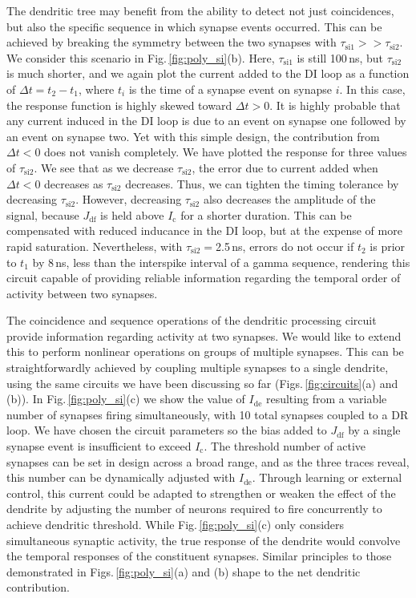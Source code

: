 \documentclass[twocolumn]{article}
\begin{document}
The dendritic tree may benefit from the ability to detect not just coincidences, but also the specific sequence in which synapse events occurred. This can be achieved by breaking the symmetry between the two synapses with $\tau_{\mathrm{si1}} >> \tau_{\mathrm{si2}}$. We consider this scenario in Fig.\,\ref{fig:poly_si}(b). Here, $\tau_{\mathrm{si1}}$ is still 100\,ns, but $\tau_{\mathrm{si2}}$ is much shorter, and we again plot the current added to the DI loop as a function of $\Delta t = t_2-t_1$, where $t_i$ is the time of a synapse event on synapse $i$. In this case, the response function is highly skewed toward $\Delta t > 0$. It is highly probable that any current induced in the DI loop is due to an event on synapse one followed by an event on synapse two. Yet with this simple design, the contribution from $\Delta t < 0$ does not vanish completely. We have plotted the response for three values of $\tau_{\mathrm{si2}}$. We see that as we decrease $\tau_{\mathrm{si2}}$, the error due to current added when $\Delta t < 0$ decreases as $\tau_{\mathrm{si2}}$ decreases. Thus, we can tighten the timing tolerance by decreasing $\tau_{\mathrm{si2}}$. However, decreasing $\tau_{\mathrm{si2}}$ also decreases the amplitude of the signal, because $J_{\mathrm{df}}$ is held above $I_{\mathrm{c}}$ for a shorter duration. This can be compensated with reduced inducance in the DI loop, but at the expense of more rapid saturation. Nevertheless, with $\tau_{\mathrm{si2}} = $2.5\,ns, errors do not occur if $t_2$ is prior to $t_1$ by 8\,ns, less than the interspike interval of a gamma sequence, rendering this circuit capable of providing reliable information regarding the temporal order of activity between two synapses.

The coincidence and sequence operations of the dendritic processing circuit provide information regarding activity at two synapses. We would like to extend this to perform nonlinear operations on groups of multiple synapses. This can be straightforwardly achieved by coupling multiple synapses to a single dendrite, using the same circuits we have been discussing so far (Figs.\,\ref{fig:circuits}(a) and (b)). In Fig.\,\ref{fig:poly_si}(c) we show the value of $I_{\mathrm{de}}$ resulting from a variable number of synapses firing simultaneously, with 10 total synapses coupled to a DR loop. We have chosen the circuit parameters so the bias added to $J_{\mathrm{df}}$ by a single synapse event is insufficient to exceed $I_{\mathrm{c}}$. The threshold number of active synapses can be set in design across a broad range, and as the three traces reveal, this number can be dynamically adjusted with $I_{\mathrm{de}}$. Through learning or external control, this current could be adapted to strengthen or weaken the effect of the dendrite by adjusting the number of neurons required to fire concurrently to achieve dendritic threshold. While Fig.\,\ref{fig:poly_si}(c) only considers simultaneous synaptic activity, the true response of the dendrite would convolve the temporal responses of the constituent synapses. Similar principles to those demonstrated in Figs.\,\ref{fig:poly_si}(a) and (b) shape to the net dendritic contribution.
\end{document}
